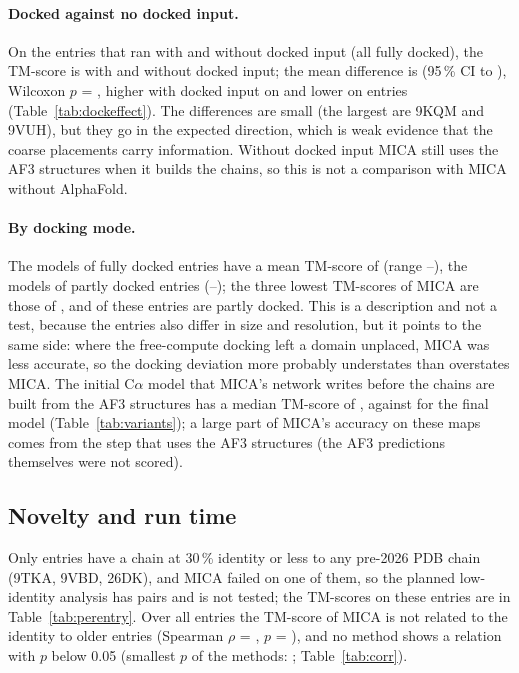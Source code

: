 \paragraph{Docked against no docked input.}
On the \DockEffectN{} entries that ran with and without docked input (all fully docked), the TM-score is \DockEffectMeanDocked{} with and \DockEffectMeanNoDock{} without docked input; the mean difference is \DockEffectMean{} (95\,\% CI \DockEffectLo{} to \DockEffectHi{}), Wilcoxon $p$ = \DockEffectP{}, higher with docked input on \DockEffectHigher{} and lower on \DockEffectLower{} entries (Table~\ref{tab:dockeffect}). The differences are small (the largest are 9KQM and 9VUH), but they go in the expected direction, which is weak evidence that the coarse placements carry information. Without docked input MICA still uses the AF3 structures when it builds the chains, so this is not a comparison with MICA without AlphaFold.

\paragraph{By docking mode.}
The \ModeFullModels{} models of fully docked entries have a mean TM-score of \ModeFullTmMean{} (range \ModeFullTmMin{}--\ModeFullTmMax{}), the \ModePartialModels{} models of partly docked entries \ModePartialTmMean{} (\ModePartialTmMin{}--\ModePartialTmMax{}); the three lowest TM-scores of MICA are those of \ModeLowThreeList{}, and \ModeLowThreePartial{} of these entries are partly docked. This is a description and not a test, because the entries also differ in size and resolution, but it points to the same side: where the free-compute docking left a domain unplaced, MICA was less accurate, so the docking deviation more probably understates than overstates MICA. The initial C$\alpha$ model that MICA's network writes before the chains are built from the AF3 structures has a median TM-score of \MicaVarInitTmMed{}, against \MicaVarAllTmMed{} for the final model (Table~\ref{tab:variants}); a large part of MICA's accuracy on these maps comes from the step that uses the AF3 structures (the AF3 predictions themselves were not scored).

\subsection{Novelty and run time}
Only \NIdentLow{} entries have a chain at 30\,\% identity or less to any pre-2026 PDB chain (9TKA, 9VBD, 26DK), and MICA failed on one of them, so the planned low-identity analysis has \NPairsTmEmprotNovel{} pairs and is not tested; the TM-scores on these entries are in Table~\ref{tab:perentry}. Over all entries the TM-score of MICA is not related to the identity to older entries (Spearman $\rho$ = \RhoIdentTmMica{}, $p$ = \RhoPIdentTmMica{}), and no method shows a relation with $p$ below 0.05 (smallest $p$ of the \NMethodsWord{} methods: \RhoIdentMinP{}; Table~\ref{tab:corr}).

